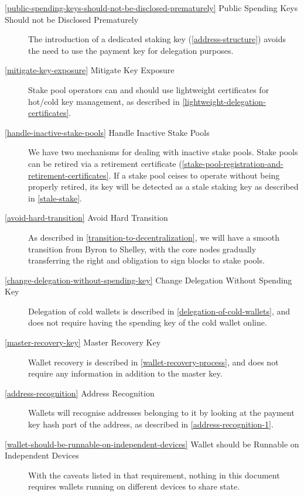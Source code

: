 \documentclass[11pt,a4paper]{article}
\begin{document}
\begin{description}
\item[\cref{public-spending-keys-should-not-be-disclosed-prematurely}
  Public Spending Keys Should not be Disclosed Prematurely] The
  introduction of a dedicated staking key (\cref{address-structure})
  avoids the need to use the payment key for delegation purposes.

\item[\cref{mitigate-key-exposure} Mitigate Key Exposure] Stake pool
  operators can and should use lightweight certificates for hot/cold
  key management, as described in
  \cref{lightweight-delegation-certificates}.

\item[\cref{handle-inactive-stake-pools} Handle Inactive Stake Pools]
  We have two mechanisms for dealing with inactive stake pools. Stake
  pools can be retired via a retirement certificate
  (\cref{stake-pool-registration-and-retirement-certificates}. If a
  stake pool ceises to operate without being properly retired, its key
  will be detected as a stale staking key as described in
  \cref{stale-stake}.

\item[\cref{avoid-hard-transition} Avoid Hard Transition] As described
  in \cref{transition-to-decentralization}, we will have a smooth
  transition from Byron to Shelley, with the core nodes gradually
  transferring the right and obligation to sign blocks to stake pools.

\item[\cref{change-delegation-without-spending-key} Change Delegation
  Without Spending Key] Delegation of cold wallets is described in
  \cref{delegation-of-cold-wallets}, and does not require having the
  spending key of the cold wallet online.

\item[\cref{master-recovery-key} Master Recovery Key] Wallet recovery
  is described in \cref{wallet-recovery-process}, and does not require
  any information in addition to the master key.

\item[\cref{address-recognition} Address Recognition] Wallets will
  recognise addresses belonging to it by looking at the payment key
  hash part of the address, as described in
  \cref{address-recognition-1}.

\item[\cref{wallet-should-be-runnable-on-independent-devices} Wallet
  should be Runnable on Independent Devices] With the caveats listed
  in that requirement, nothing in this document requires wallets
  running on different devices to share state.


\end{description}
\end{document}
